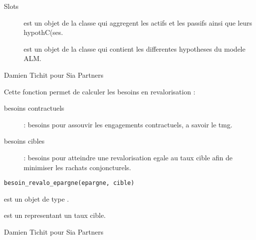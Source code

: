 \documentclass[a4paper]{book}
\begin{document}
%
\begin{Section}{Slots}

\begin{description}

\item[] est un objet de la classe  qui aggregent les actifs et les passifs ainsi que leurs hypothC(ses.

\item[] est un objet de la classe  qui contient les differentes hypotheses du modele ALM.

\end{description}
\end{Section}
%
\begin{Author}\relax
Damien Tichit pour Sia Partners
\end{Author}
%
\begin{Description}\relax
Cette fonction permet de calculer les besoins en revalorisation :
\begin{description}

\item[besoins contractuels]  : besoins pour assouvir les engagements contractuels, a savoir le tmg.
\item[besoins cibles]  : besoins pour atteindre une revalorisation egale au taux cible afin de minimiser les rachats conjoncturels.

\end{description}

\end{Description}
%
\begin{Usage}
\begin{verbatim}
besoin_revalo_epargne(epargne, cible)
\end{verbatim}
\end{Usage}
%
\begin{Arguments}
\begin{ldescription}
\item[\code{epargne}] est un objet de type .

\item[\code{cible}] est un  representant un taux cible.
\end{ldescription}
\end{Arguments}
%
\begin{Author}\relax
Damien Tichit pour Sia Partners
\end{Author}
\end{document}
